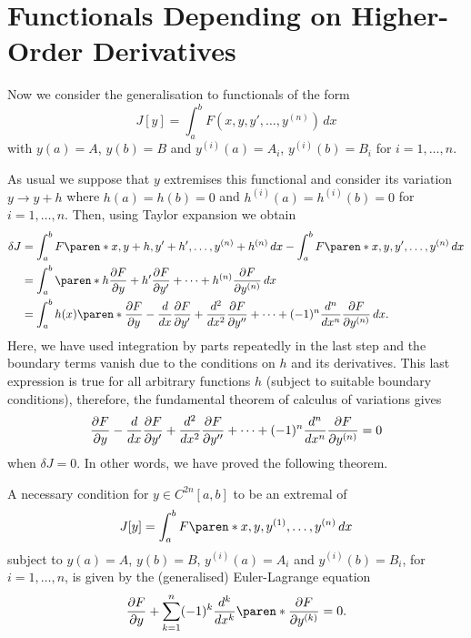 \documentclass[11pt]{penrose}
\begin{document}
\section{Functionals Depending on Higher-Order Derivatives}
Now we consider the generalisation to functionals of the form
\begin{equation}
    J[y] = \int_a^b F(x, y, y', \dots, y^{(n)}) \,dx
\end{equation}
with $y(a) = A$, $y(b) = B$ and $y^{(i)}(a) = A_i$, $y^{(i)}(b) = B_i$ for $i=1, \dots, n$.

As usual we suppose that $y$ extremises this functional and consider its variation $y \to y + h$ where $h(a) = h(b) = 0$ and $h^{(i)}(a) = h^{(i)}(b) = 0$ for $i=1, \dots, n$. Then, using Taylor expansion we obtain
\begin{align}
    \delta J
    &= \int_a^b F\paren*{x, y+h, y'+h', \dots, y^{(n)}+h^{(n)}} \,dx
    - \int_a^b F\paren*{x, y, y', \dots, y^{(n)}} \,dx\\
    &= \int_a^b \paren*{h \frac{\pd F}{\pd y} + h' \frac{\pd F}{\pd y'} + \dots + h^{(n)} \frac{\pd F}{\pd y^{(n)}}} \,dx\\
    &= \int_a^b h(x) \paren*{ \frac{\pd F}{\pd y} - \frac{d}{dx} \frac{\pd F}{\pd y'} + \frac{d^2}{dx^2} \frac{\pd F}{\pd y''} + \dots + (-1)^n \frac{d^n}{dx^n} \frac{\pd F}{\pd y^{(n)}} } \,dx.
\end{align}
Here, we have used integration by parts repeatedly in the last step and the boundary terms vanish due to the conditions on $h$ and its derivatives. This last expression is true for all arbitrary functions $h$ (subject to suitable boundary conditions), therefore, the fundamental theorem of calculus of variations gives
\begin{equation}
    \frac{\partial F}{\partial y} - \frac{d}{dx} \frac{\partial F}{\partial y'} + \frac{d^2}{dx^2} \frac{\partial F}{\partial y''} + \dots + (-1)^n \frac{d^n}{dx^n} \frac{\partial F}{\partial y^{(n)}} = 0
\end{equation}
when $\delta J = 0$. In other words, we have proved the following theorem.

\begin{nthm}
    A necessary condition for $y \in C^{2n}[a,b]$ to be an extremal of
    \begin{equation}
        J[y] = \int_a^b F\paren*{x, y, y^{(1)}, \dots, y^{(n)}} \,dx
    \end{equation}
    subject to $y(a) = A$, $y(b) = B$, $y^{(i)}(a) = A_i$ and $y^{(i)}(b) = B_i$, for $i=1, \dots, n$, is given by the (generalised) Euler-Lagrange equation
    \begin{equation}
        \frac{\pd F}{\pd y} + \sum_{k=1}^{n} (-1)^k \frac{d^k}{dx^k} \paren*{\frac{\pd F}{\pd y^{(k)}}} = 0.
        \label{eq:el-higher-deriv}
    \end{equation}
\end{nthm}
\end{document}
